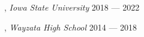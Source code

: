
, \textit{Iowa State University} \hfill 2018 --- 2022

, \textit{Wayzata High School} \hfill	2014 --- 2018
